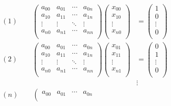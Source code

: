 \documentclass[11pt]{article}
\begin{document}
\begin{equation}
\begin{split}
\begin{aligned}
(1) \qquad
\left(
\begin{matrix}
a_{00} & a_{01} & \cdots & a_{0n} \\
a_{10} & a_{11} & \cdots & a_{1n} \\
\vdots & \vdots & \ddots & \vdots \\
a_{n0} & a_{n1} & \cdots & a_{nn} \\
\end{matrix}
\right)
\left(
\begin{matrix}
x_{00} \\
x_{10} \\
\vdots \\
x_{n0} \\
\end{matrix}
\right)
&=
\left(
\begin{matrix}
1 \\
0 \\
\vdots \\
0 \\
\end{matrix}
\right)
\\
(2) \qquad
\left(
\begin{matrix}
a_{00} & a_{01} & \cdots & a_{0n} \\
a_{10} & a_{11} & \cdots & a_{1n} \\
\vdots & \vdots & \ddots & \vdots \\
a_{n0} & a_{n1} & \cdots & a_{nn} \\
\end{matrix}
\right)
\left(
\begin{matrix}
x_{01} \\
x_{11} \\
\vdots \\
x_{n1} \\
\end{matrix}
\right)
&=
\left(
\begin{matrix}
0 \\
1 \\
\vdots \\
0 \\
\end{matrix}
\right)
\\
&\vdots
\\
(n) \qquad
\left(
\begin{matrix}
a_{00} & a_{01} & \cdots & a_{0n} \\

\end{matrix}
\end{aligned}
\end{split}
\end{equation}
\end{document}
